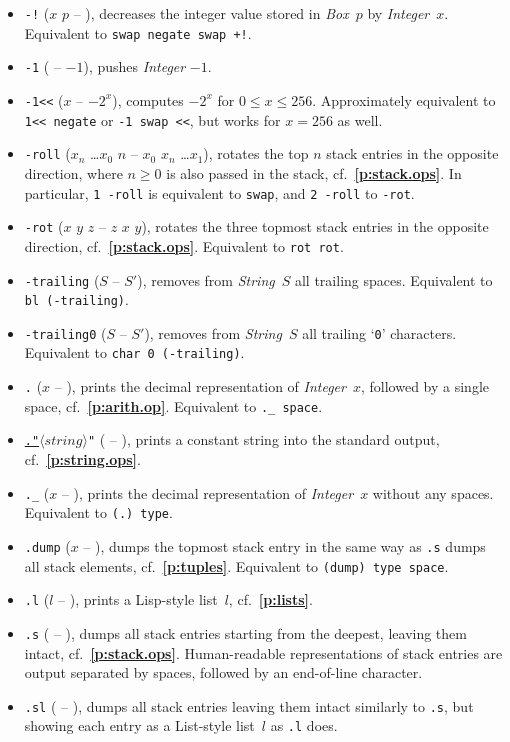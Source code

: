 \documentclass[12pt,oneside]{article}
\def\refpoint#1{{\rm\textbf{\ref{#1}}}}
\let\ptref=\refpoint
\begin{document}
\begin{itemize}
\item {\tt -!} ($x$ $p$ -- ), decreases the integer value stored in {\em Box\/}~$p$ by {\em Integer\/}~$x$. Equivalent to {\tt swap negate swap +!}.
\item {\tt -1} ( -- $-1$), pushes {\em Integer\/} $-1$.
\item {\tt -1<{}<} ($x$ -- $-2^x$), computes $-2^x$ for $0\leq x\leq 256$. Approximately equivalent to {\tt 1<{}< negate} or {\tt -1 swap <{}<}, but works for $x=256$ as well.
\item {\tt -roll} ($x_n$ \dots $x_0$ $n$ -- $x_0$ $x_n$ \dots $x_1$), rotates the top $n$ stack entries in the opposite direction, where $n\geq0$ is also passed in the stack, cf.~\ptref{p:stack.ops}. In particular, {\tt 1 -roll} is equivalent to {\tt swap}, and {\tt 2 -roll} to {\tt -rot}.
\item {\tt -rot} ($x$ $y$ $z$ -- $z$ $x$ $y$), rotates the three topmost stack entries in the opposite direction, cf.~\ptref{p:stack.ops}. Equivalent to {\tt rot rot}.
\item {\tt -trailing} ($S$ -- $S'$), removes from {\em String\/}~$S$ all trailing spaces. Equivalent to {\tt bl (-trailing)}.
\item {\tt -trailing0} ($S$ -- $S'$), removes from {\em String\/}~$S$ all trailing `{\tt 0}' characters. Equivalent to {\tt char 0 (-trailing)}.
\item {\tt .} ($x$ -- ), prints the decimal representation of {\em Integer\/}~$x$, followed by a single space, cf.~\ptref{p:arith.op}. Equivalent to {\tt .\_ space}.
\item {\tt\underline{."}$\langle\textit{string}\rangle$"} ( -- ), prints a constant string into the standard output, cf.~\ptref{p:string.ops}.
\item {\tt .\_} ($x$ -- ), prints the decimal representation of {\em Integer\/}~$x$ without any spaces. Equivalent to {\tt (.)~type}.
\item {\tt .dump} ($x$ -- ), dumps the topmost stack entry in the same way as {\tt .s} dumps all stack elements, cf.~\ptref{p:tuples}. Equivalent to {\tt (dump) type space}.
\item {\tt .l} ($l$ -- ), prints a Lisp-style list~$l$, cf.~\ptref{p:lists}.
\item {\tt .s} ( -- ), dumps all stack entries starting from the deepest, leaving them intact, cf.~\ptref{p:stack.ops}. Human-readable representations of stack entries are output separated by spaces, followed by an end-of-line character.
\item {\tt .sl} ( -- ), dumps all stack entries leaving them intact similarly to {\tt .s}, but showing each entry as a List-style list~$l$ as {\tt .l} does.

\end{itemize}
\end{document}
